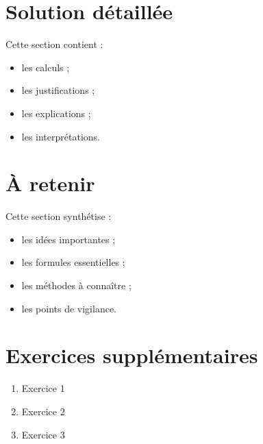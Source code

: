 \documentclass[11pt,a4paper]{article}
\begin{document}
\section{Solution détaillée}

\begin{cadresolution}
Cette section contient :
\begin{itemize}
    \item les calculs ;
    \item les justifications ;
    \item les explications ;
    \item les interprétations.
\end{itemize}
\end{cadresolution}

\section{À retenir}

\begin{cadresynthese}
Cette section synthétise :
\begin{itemize}
    \item les idées importantes ;
    \item les formules essentielles ;
    \item les méthodes à connaître ;
    \item les points de vigilance.
\end{itemize}
\end{cadresynthese}

\section{Exercices supplémentaires}

\begin{cadreactivite}
\begin{enumerate}
    \item Exercice 1
    \item Exercice 2
    \item Exercice 3
\end{enumerate}
\end{cadreactivite}
\end{document}
